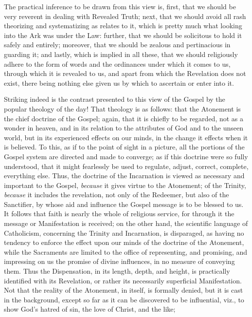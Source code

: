 The practical inference to be drawn from this
view is, first, that we should be very reverent in dealing with
Revealed Truth; next, that we should avoid all rash theorizing and
systematizing as relates to it, which is pretty much what looking into
the Ark was under the Law: further, that we should be solicitous to
hold it safely and entirely; moreover, that we should be zealous and
pertinacious in guarding it; and lastly, which is implied in all
these, that we should religiously adhere to the form of words and the
ordinances under which it comes to us, through which it is revealed to
us, and apart from which the Revelation does not exist, there being
nothing else given us by which to ascertain or enter into it.

Striking indeed is the contrast presented to this
view of the Gospel by the popular theology of the day! That theology
is as follows: that the Atonement is the chief doctrine of the Gospel;
again, that it is chiefly to be regarded, not as a wonder in heaven,
and in its relation to the attributes of God and to the unseen world,
but in its experienced effects on our minds, in the change it effects
when it is believed. To this, as if to the point of sight in a
picture, all the portions of the Gospel system are directed and made
to converge; as if this doctrine were so fully understood, that it
might fearlessly be used to regulate, adjust, correct, complete,
everything else. Thus, the doctrine of the Incarnation is viewed as
necessary and important to the Gospel, \emph{because} it gives virtue
to the Atonement; of the Trinity, \emph{because} it includes the
revelation, not only of the Redeemer, but also of the Sanctifier, by
whose aid and influence the Gospel message is to be blessed to us. It
follows that faith is nearly the whole of religious service, for
through it the message or Manifestation is received; on the other
hand, the scientific language of Catholicism, concerning the Trinity
and Incarnation, is disparaged, as having no tendency to enforce
the effect upon our minds of the doctrine of the Atonement, while the
Sacraments are limited to the office of representing, and promising,
and impressing on us the promise of divine influences, in no measure
of conveying them. Thus the Dispensation, in its length, depth, and
height, is practically identified with its Revelation, or rather its
necessarily superficial Manifestation. Not that the reality of the
Atonement, in itself, is formally denied, but it is cast in the
background, except so far as it can be discovered to be influential,
viz., to show God's hatred of sin, the love of Christ, and the like;
